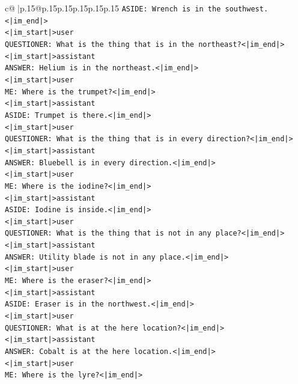 \documentclass{article}
\begin{document}
{\begin{supertabular}{c@{$\;$}|p{.15\linewidth}@{}p{.15\linewidth}p{.15\linewidth}p{.15\linewidth}p{.15\linewidth}p{.15\linewidth}}
{{{\texttt{ASIDE: Wrench is in the southwest.<|im\_end|>} \\
\texttt{<|im\_start|>user} \\
\texttt{QUESTIONER: What is the thing that is in the northeast?<|im\_end|>} \\
\texttt{<|im\_start|>assistant} \\
\texttt{ANSWER: Helium is in the northeast.<|im\_end|>} \\
\texttt{<|im\_start|>user} \\
\texttt{ME: Where is the trumpet?<|im\_end|>} \\
\texttt{<|im\_start|>assistant} \\
\texttt{ASIDE: Trumpet is there.<|im\_end|>} \\
\texttt{<|im\_start|>user} \\
\texttt{QUESTIONER: What is the thing that is in every direction?<|im\_end|>} \\
\texttt{<|im\_start|>assistant} \\
\texttt{ANSWER: Bluebell is in every direction.<|im\_end|>} \\
\texttt{<|im\_start|>user} \\
\texttt{ME: Where is the iodine?<|im\_end|>} \\
\texttt{<|im\_start|>assistant} \\
\texttt{ASIDE: Iodine is inside.<|im\_end|>} \\
\texttt{<|im\_start|>user} \\
\texttt{QUESTIONER: What is the thing that is not in any place?<|im\_end|>} \\
\texttt{<|im\_start|>assistant} \\
\texttt{ANSWER: Utility blade is not in any place.<|im\_end|>} \\
\texttt{<|im\_start|>user} \\
\texttt{ME: Where is the eraser?<|im\_end|>} \\
\texttt{<|im\_start|>assistant} \\
\texttt{ASIDE: Eraser is in the northwest.<|im\_end|>} \\
\texttt{<|im\_start|>user} \\
\texttt{QUESTIONER: What is at the here location?<|im\_end|>} \\
\texttt{<|im\_start|>assistant} \\
\texttt{ANSWER: Cobalt is at the here location.<|im\_end|>} \\
\texttt{<|im\_start|>user} \\
\texttt{ME: Where is the lyre?<|im\_end|>} \\
}}}
\end{supertabular}}
\end{document}
